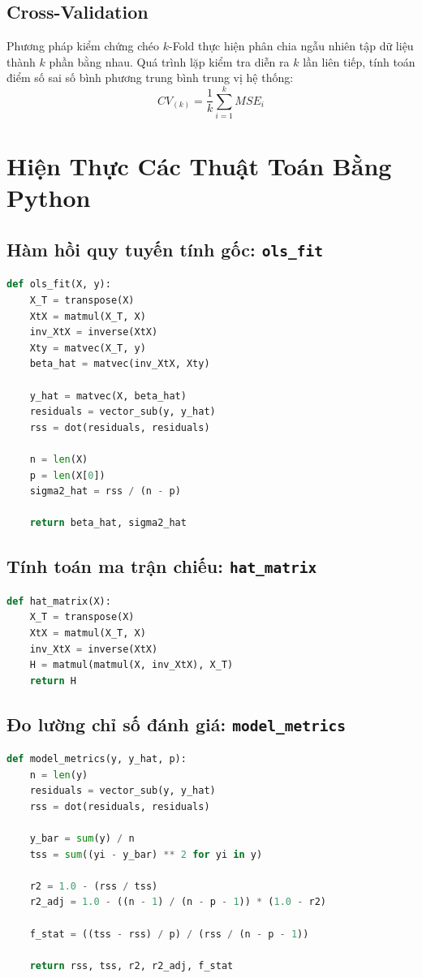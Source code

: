 \documentclass[12pt,a4paper]{report}
\begin{document}
\subsection{Cross-Validation}

Phương pháp kiểm chứng chéo $k$-Fold thực hiện phân chia ngẫu nhiên tập dữ liệu thành $k$ phần bằng nhau. Quá trình lặp kiểm tra diễn ra $k$ lần liên tiếp, tính toán điểm số sai số bình phương trung bình trung vị hệ thống:
\begin{equation}
    CV_{(k)} = \frac{1}{k}\sum_{i=1}^k MSE_i
\end{equation}

\section{Hiện Thực Các Thuật Toán Bằng Python}

\subsection{Hàm hồi quy tuyến tính gốc: \texttt{ols\_fit}}
\begin{lstlisting}[language=Python]
def ols_fit(X, y):
    X_T = transpose(X)
    XtX = matmul(X_T, X)
    inv_XtX = inverse(XtX)
    Xty = matvec(X_T, y)
    beta_hat = matvec(inv_XtX, Xty)
    
    y_hat = matvec(X, beta_hat)
    residuals = vector_sub(y, y_hat)
    rss = dot(residuals, residuals)
    
    n = len(X)
    p = len(X[0])
    sigma2_hat = rss / (n - p)
    
    return beta_hat, sigma2_hat
\end{lstlisting}

\subsection{Tính toán ma trận chiếu: \texttt{hat\_matrix}}
\begin{lstlisting}[language=Python]
def hat_matrix(X):
    X_T = transpose(X)
    XtX = matmul(X_T, X)
    inv_XtX = inverse(XtX)
    H = matmul(matmul(X, inv_XtX), X_T)
    return H
\end{lstlisting}

\subsection{Đo lường chỉ số đánh giá: \texttt{model\_metrics}}
\begin{lstlisting}[language=Python]
def model_metrics(y, y_hat, p):
    n = len(y)
    residuals = vector_sub(y, y_hat)
    rss = dot(residuals, residuals)
    
    y_bar = sum(y) / n
    tss = sum((yi - y_bar) ** 2 for yi in y)
    
    r2 = 1.0 - (rss / tss)
    r2_adj = 1.0 - ((n - 1) / (n - p - 1)) * (1.0 - r2)
    
    f_stat = ((tss - rss) / p) / (rss / (n - p - 1))
    
    return rss, tss, r2, r2_adj, f_stat
\end{lstlisting}
\end{document}
